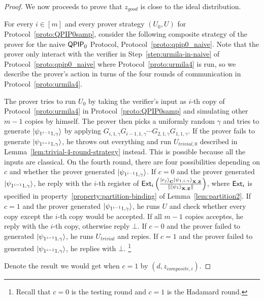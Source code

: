 \begin{proof}
We now proceeds to prove that $z_{good}$ is close to the ideal distribution. 

For every $i\in [m]$ and every prover strategy $(U_0,U)$ for Protocol~\ref{proto:QPIP0samp}, consider the following composite strategy of the prover for the naive $\operatorname{\mathsf{QPIP}}_0$ Protocol, Protocol~\ref{proto:qpip0_naive}. Note that the prover only interact with the verifier in Step~\ref{step:urmila-in-naive} of Protocol~\ref{proto:qpip0_naive} where Protocol~\ref{proto:urmila4} is run, so we describe the prover's action in turns of the four rounds of communication in Protocol~\ref{proto:urmila4}.

The prover tries to run $U_0$ by taking the verifier's input as $i$-th copy of Protocol~\ref{proto:urmila4} in Protocol~\ref{proto:QPIP0samp} and simulating other $m-1$ copies by himself. The prover then picks a uniformly random $\gamma$ and  tries to generate $\ket{\psi_{1^{i-1}1,\gamma}}$ by applying $G_{i,1,\gamma}G_{i-1,1,\gamma} \cdots G_{2,1,\gamma}G_{1,1,\gamma}$. If the prover fails to generate $\ket{\psi_{1^{i-1}1,\gamma}}$, he throws out everything and run $U_{trivial,0}$ described  in  Lemma~\ref{lem:trivial-4-round-strategy} instead. This is possible because all the inputs are classical. On the fourth round, there are four possibilities depending on $c$ and whether the prover generated $\ket{\psi_{1^{i-1}1,\gamma}}$. If $c=0$ and the prover generated $\ket{\psi_{1^{i-1}1,\gamma}}$, he reply with the $i$-th register of $\mathsf{Ext}_i\left(\frac{\ket{e_j}_{\mathbf{C}}\ket{\psi_{1,i,\gamma}}_{\mathbf{X},\mathbf{Z}}}{\|\ket{\psi_1}_{\mathbf{X},\mathbf{Z}}\|}\right)$, where $\mathsf{Ext}_i$ is specified in property~\ref{property:partition-binding} of Lemma~\ref{lem:partition2}. If $c=1$ and the prover generated $\ket{\psi_{1^{i-1}1,\gamma}}$, he runs $U$ and check whether every copy except the $i$-th copy would be accepted. If all $m-1$ copies acceptes, he reply with the $i$-th copy, otherwise reply $\bot$. If $c-0$ and the prover failed to generated $\ket{\psi_{1^{i-1}1,\gamma}}$, he runs $U_{trivial}$ and repies. If $c=1$ and the prover failed to generated $\ket{\psi_{1^{i-1}1,\gamma}}$, he replies with $\bot$. \footnote{Recall that $c=0$ is the testing round and $c=1$ is the Hadamard round.}





Denote the result we would get when $c=1$ by $(d,z_{composite,i})$.


\end{proof}
